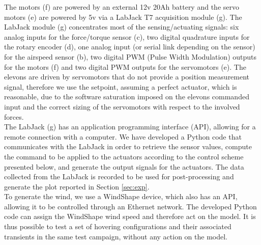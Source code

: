 The motors (f) are powered by an external 12v 20Ah battery and the servo motors (e) are powered by 5v via a LabJack T7 \cite[]{LabJack} acquisition module (g). The LabJack module (g) concentrates most of the sensing/actuating signals: six analog inputs for the force/torque sensor (c), two digital quadrature inputs for the rotary encoder (d), one analog input (or serial link depending on the sensor) for the airspeed sensor (b), two digital PWM (Pulse Width Modulation) outputs for the motors (f) and two digital PWM outputs for the servomotors (e). 
The elevons are driven by servomotors that do not provide a position measurement signal, therefore we use the setpoint, assuming a perfect actuator, which is reasonable, due to the software saturation imposed on the elevons commanded input and the correct sizing of the servomotors with respect to the involved forces.\\
The LabJack  (g)  has an application programming interface (API), allowing for a remote connection with a computer. We have developed a Python code that communicates with the LabJack in order to retrieve the sensor values, compute the command to be applied to the actuators according to the control scheme presented below, and generate the output signals for the actuators. The data collected from the LabJack is recorded to be used for post-processing and generate the plot reported in Section \ref{sec:exp}. \\
To generate the wind, we use a WindShape device, which also has an API, allowing it to be controlled through an Ethernet network. The developed Python code can assign the WindShape wind speed and therefore act on the model. It is thus possible to test a set of hovering configurations and their associated transients in the same test campaign, without any action on the model. 



